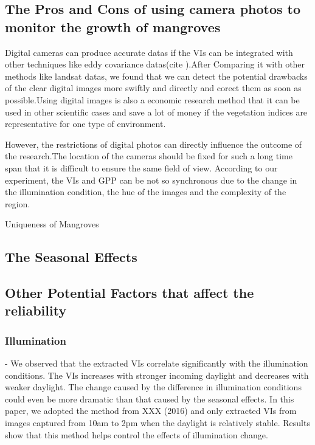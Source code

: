 \documentclass{article}
\begin{document}
\subsection{The Pros and Cons of using camera photos to monitor the growth of mangroves}
Digital cameras can produce accurate datas if the VIs can be integrated with other techniques like eddy covariance datas(cite   ).After Comparing it with other methods like landsat datas, we found that we can detect the potential drawbacks of the clear digital images more swiftly and directly and corect them as soon as possible.Using digital images is also a economic research method that it can be used in other scientific cases and save a lot of money if the vegetation indices are representative for one type of environment.

However, the restrictions of digital photos can directly influence the outcome of the research.The location of the cameras should be fixed for such a long time span that it is difficult to ensure the same field of view.
According to our experiment, the VIs and GPP can be not so synchronous due to the change in the illumination condition, the hue of the images and the complexity of the region. 



Uniqueness of Mangroves 

\subsection{The Seasonal Effects}



\subsection{Other Potential Factors that affect the reliability}
\subsubsection{Illumination}
- We observed that the extracted VIs correlate significantly with the illumination conditions. The VIs increases with stronger incoming daylight and decreases with weaker daylight. The change caused by the difference in illumination conditions could even be more dramatic than that caused by the seasonal effects. In this paper, we adopted the method from XXX (2016) and only extracted VIs from images captured from 10am to 2pm when the daylight is relatively stable. Results show that this method helps control the effects of illumination change. 
\end{document}
